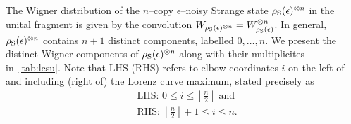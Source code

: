 The Wigner distribution of the $n$--copy $\epsilon$--noisy Strange state $\rho_{\rm{S}}(\epsilon)^{\otimes n}$ in the unital fragment is given by the convolution $\W{\rho_{\rm{S}}(\epsilon)^{\otimes n}} = W_{\rho_{\rm{S}}(\epsilon)}^{\otimes n}$.
In general, $\rho_{\rm{S}}(\epsilon)^{\otimes n}$ contains $n + 1$ distinct components, labelled $0,\dots, n$.
We present the distinct Wigner components of $\rho_{\rm{S}}(\epsilon)^{\otimes n}$ along with their multiplicites in~\cref{tab:lcsu}.
Note that LHS (RHS) refers to elbow coordinates $i$ on the left of and including (right of) the Lorenz curve maximum, stated precisely as
\begin{align}
&\text{LHS: } 0 \leq i \leq \left\lfloor \frac{n}{2} \right\rfloor \text{ and} \\
&\text{RHS: } \left\lfloor \frac{n}{2} \right\rfloor +1 \leq i \leq n.
\end{align}
